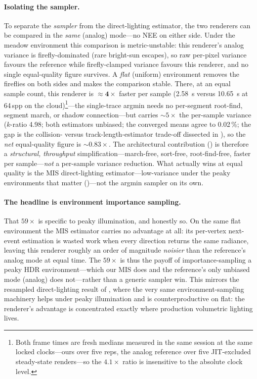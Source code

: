 \paragraph{Isolating the sampler.} To separate the \emph{sampler} from the direct-lighting estimator,
the two renderers can be compared in the \emph{same} (analog) mode---no NEE on either side. Under the
meadow environment this comparison is metric-unstable: this renderer's analog variance is
firefly-dominated (rare bright-sun escapes), so raw per-pixel variance favours the reference while
firefly-clamped variance favours this renderer, and no single equal-quality figure survives. A
\emph{flat} (uniform) environment removes the fireflies on both sides and makes the comparison stable.
There, at an equal sample count, this renderer is \(\mathbf{\approx\!4\times}\) faster per sample
(\SI{2.58}{\second} versus \SI{10.65}{\second} at \num{64}\,spp on the cloud)\footnote{Both frame times
are fresh medians measured in the same session at the same locked clocks---ours over five reps, the
analog reference over five JIT-excluded steady-state renders---so the \(4.1\times\) ratio is insensitive
to the absolute clock level.}---the single-trace argmin needs no per-segment root-find, segment march, or shadow connection---but carries \(\sim\!5\times\)
the per-sample variance ($k$-ratio \num{4.98}; both estimators unbiased; the converged means agree to \num{0.02}\,\%; the gap
is the collision- versus track-length-estimator trade-off dissected in ), so the
\emph{net} equal-quality figure is \(\sim\!0.83\times\). The architectural contribution
() is therefore a \emph{structural, throughput} simplification---march-free,
sort-free, root-find-free, faster per sample---\emph{not} a per-sample variance reduction. What actually wins at
equal quality is the MIS direct-lighting estimator---low-variance under the peaky environments that
matter ()---not the argmin sampler on its own.

\paragraph{The headline is environment importance sampling.} That \(59\times\) is specific to peaky
illumination, and honestly so. On the same flat environment the MIS estimator carries no advantage at
all: its per-vertex next-event estimation is wasted work when every direction returns the same radiance,
leaving this renderer roughly an order of magnitude \emph{noisier} than the reference's analog mode at
equal time. The \(59\times\) is thus the payoff of importance-sampling a peaky HDR environment---which
our MIS does and the reference's only unbiased mode (analog) does not---rather than a generic sampler
win. This mirrors the resampled direct-lighting result of , where the very same
environment-sampling machinery helps under peaky illumination and is counterproductive on flat: the
renderer's advantage is concentrated exactly where production volumetric lighting lives.

